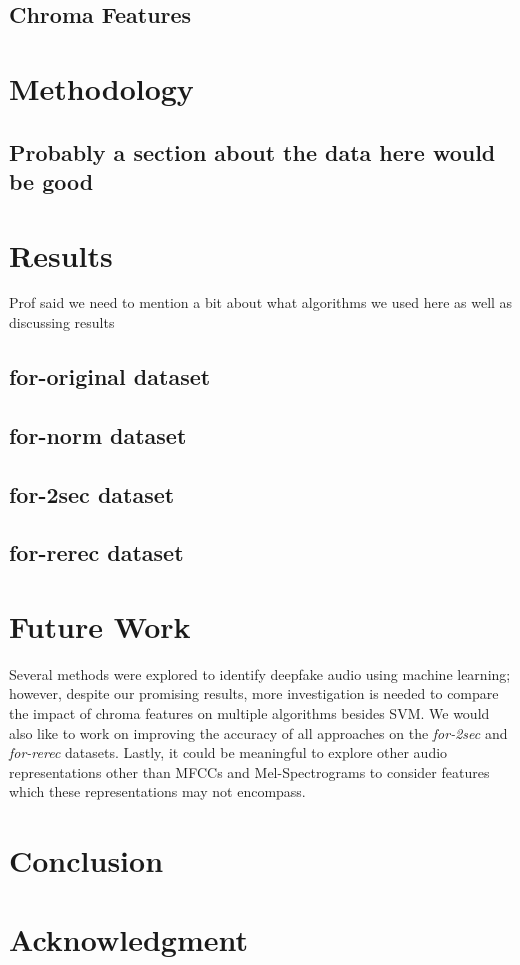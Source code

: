 \documentclass[conference]{IEEEtran}
\begin{document}
\subsection{Chroma Features}

\section{Methodology}

\subsection{Probably a section about the data here would be good}

\section{Results}

Prof said we need to mention a bit about what algorithms we used here as well as discussing results

\subsection{for-original dataset}

\subsection{for-norm dataset}

\subsection{for-2sec dataset}

\subsection{for-rerec dataset}

\section{Future Work}
Several methods were explored to identify deepfake audio using machine learning; however, despite our promising results, more investigation is needed to compare the impact of chroma features on multiple algorithms besides SVM. We would also like to work on improving the accuracy of all approaches on the \textit{for-2sec} and \textit{for-rerec} datasets. Lastly, it could be meaningful to explore other audio representations other than MFCCs and Mel-Spectrograms to consider features which these representations may not encompass. 

\section{Conclusion}

\section*{Acknowledgment}


\end{document}
